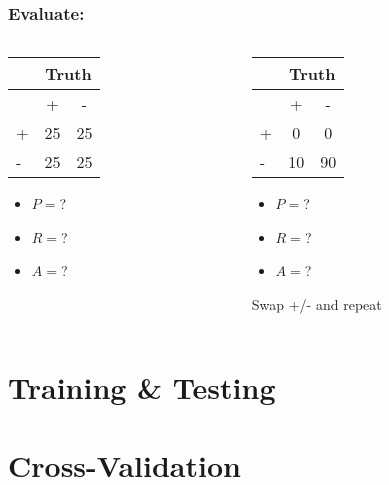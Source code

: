\documentclass[mathserif, xcolor=table, svgnames]{beamer}
\begin{document}
\begin{frame}
  \frametitle{Evaluate:}
  \begin{columns}
    \begin{column}{0.5\linewidth}
      \begin{center}
        \begin{tabular}[b]{|l|cc|}
          & \multicolumn{2}{c}{Truth}\\
          \midrule
          & + & -\\
          \midrule
          + & 25 & 25\\
          - & 25 & 25\\
          \bottomrule
        \end{tabular}
      \end{center}
      \begin{itemize}
      \item $P =$?
      \item $R =$?
      \item $A =$?
      \end{itemize}
    \end{column}
    \begin{column}{0.5\linewidth}
      \begin{center}
        \begin{tabular}[b]{|l|cc|}
          & \multicolumn{2}{c}{Truth}\\
          \midrule
          & + & -\\
          \midrule
          + &  0 &  0\\
          - & 10 & 90\\
          \bottomrule
        \end{tabular}
      \end{center}
      \begin{itemize}
      \item $P =$?
      \item $R =$?
      \item $A =$?
      \end{itemize}
      Swap +/- and repeat
    \end{column}
  \end{columns}
\end{frame}

{

}

\section{Training \& Testing}
\frame{\tableofcontents[currentsection]}

{

}

\section{Cross-Validation}
\frame{\tableofcontents[currentsection]}

{

}
  
\end{document}
